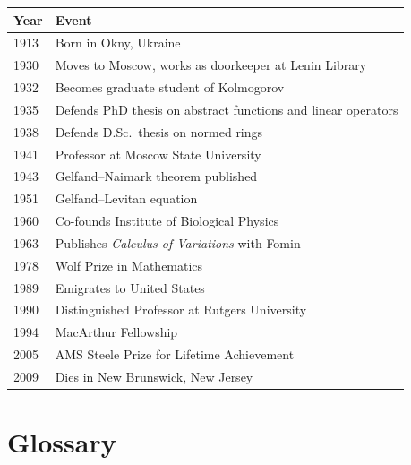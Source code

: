 \begin{tabularx}{\linewidth}{|p{1.5cm}|>{\raggedright\arraybackslash}X|}
\hline
\textbf{Year} & \textbf{Event} \\ \hline
1913 & Born in Okny, Ukraine \\ \hline
1930 & Moves to Moscow, works as doorkeeper at Lenin Library \\ \hline
1932 & Becomes graduate student of Kolmogorov \\ \hline
1935 & Defends PhD thesis on abstract functions and linear operators \\ \hline
1938 & Defends D.Sc.\ thesis on normed rings \\ \hline
1941 & Professor at Moscow State University \\ \hline
1943 & Gelfand--Naimark theorem published \\ \hline
1951 & Gelfand--Levitan equation \\ \hline
1960 & Co-founds Institute of Biological Physics \\ \hline
1963 & Publishes \textit{Calculus of Variations} with Fomin \\ \hline
1978 & Wolf Prize in Mathematics \\ \hline
1989 & Emigrates to United States \\ \hline
1990 & Distinguished Professor at Rutgers University \\ \hline
1994 & MacArthur Fellowship \\ \hline
2005 & AMS Steele Prize for Lifetime Achievement \\ \hline
2009 & Dies in New Brunswick, New Jersey \\ \hline
\end{tabularx}

\section*{Glossary}

